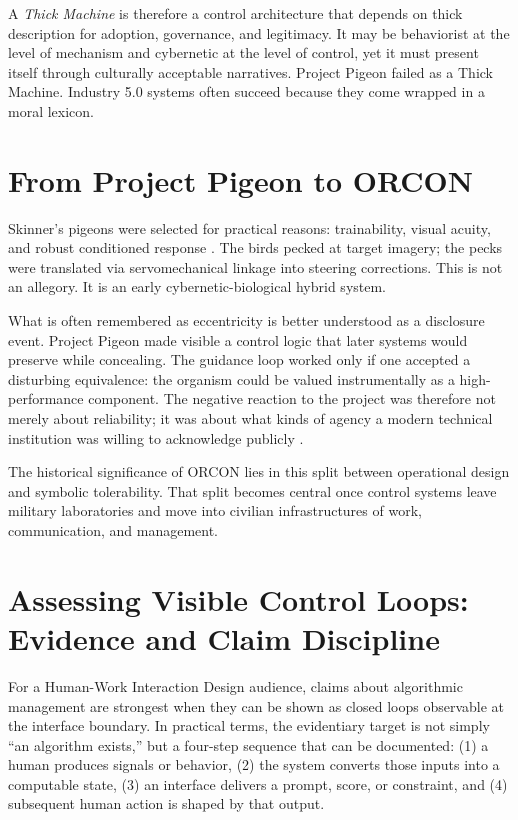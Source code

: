 \documentclass[runningheads]{llncs}
\begin{document}
A \emph{Thick Machine} is therefore a control architecture that depends on thick description for adoption, governance, and legitimacy. It may be behaviorist at the level of mechanism and cybernetic at the level of control, yet it must present itself through culturally acceptable narratives. Project Pigeon failed as a Thick Machine. Industry 5.0 systems often succeed because they come wrapped in a moral lexicon.

\section{From Project Pigeon to ORCON}

Skinner's pigeons were selected for practical reasons: trainability, visual acuity, and robust conditioned response \cite{skinner1960pigeons}. The birds pecked at target imagery; the pecks were translated via servomechanical linkage into steering corrections. This is not an allegory. It is an early cybernetic-biological hybrid system.

What is often remembered as eccentricity is better understood as a disclosure event. Project Pigeon made visible a control logic that later systems would preserve while concealing. The guidance loop worked only if one accepted a disturbing equivalence: the organism could be valued instrumentally as a high-performance component. The negative reaction to the project was therefore not merely about reliability; it was about what kinds of agency a modern technical institution was willing to acknowledge publicly \cite{capshew1993engineering,schultzfigueroa2019project,wlodarczyk2020beyond}.

The historical significance of ORCON lies in this split between operational design and symbolic tolerability. That split becomes central once control systems leave military laboratories and move into civilian infrastructures of work, communication, and management.

\section{Assessing Visible Control Loops: Evidence and Claim Discipline}

For a Human-Work Interaction Design audience, claims about algorithmic management are strongest when they can be shown as closed loops observable at the interface boundary. In practical terms, the evidentiary target is not simply ``an algorithm exists,'' but a four-step sequence that can be documented: (1) a human produces signals or behavior, (2) the system converts those inputs into a computable state, (3) an interface delivers a prompt, score, or constraint, and (4) subsequent human action is shaped by that output.
\end{document}
